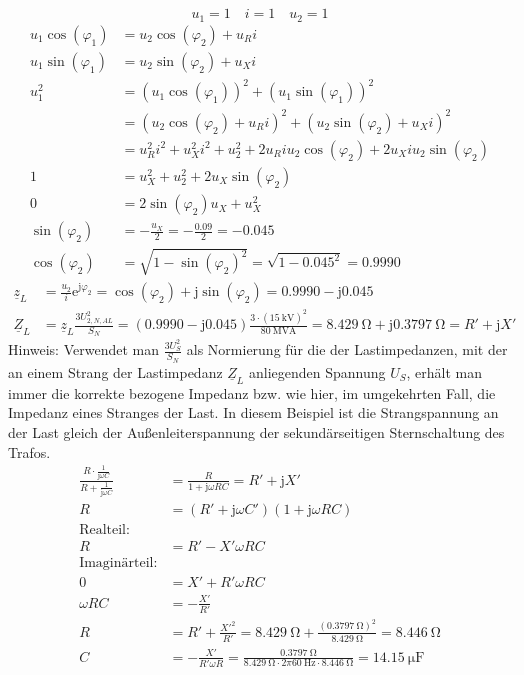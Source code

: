\documentclass[11pt,a4paper]{scrartcl}
\newcommand{\mybr}[1]{\left(#1\right)}
\renewcommand{\j}{\mathrm{j}}
\newcommand{\Z}{\underline{Z}}
\newcommand{\z}{\underline{z}}
\newcommand{\0}{_{\mybr{0}}}
\newcommand{\1}{_{\mybr{1}}}
\newcommand{\2}{_{\mybr{2}}}
\newcommand{\USNA}{U_{2,N,AL}}
\newcommand{\ce}{\cos\mybr{\varphi_1}}
\newcommand{\se}{\sin\mybr{\varphi_1}}
\newcommand{\cz}{\cos\mybr{\varphi_2}}
\newcommand{\sz}{\sin\mybr{\varphi_2}}
\renewcommand{\e}{\mathrm{e}}
\begin{document}
\subsection{}
\begin{equation}
u_1=1\quad i=1\quad u_2=1
\end{equation}
\begin{align}
u_1\ce&=u_2\cz+u_R i\\
u_1\se&=u_2\sz+u_X i\\
u_1^2&=\mybr{u_1\ce}^2+\mybr{u_1\se}^2\\
&=\mybr{u_2\cz+u_R i}^2+\mybr{u_2\sz+u_X i}^2\\
&=u_R^2i^2+u_X^2i^2+u_2^2+2u_R i u_2 \cz+2u_X i u_2\sz\\
1&=u_X^2+u_2^2+2u_X\sz\\
0&=2\sz u_X+u_X^2\\
\sz&=-\frac{u_X}{2}=-\frac{\num{0.09}}{2}=\num{-0.045}\\
\cz&=\sqrt{1-\sz^2}=\sqrt{1-\num{0.045}^2}=\num{0.9990}
\end{align}
\begin{align}
\z_L&=\frac{u_2}{i}\e^{\j\varphi_2}=\cz+\j\sz=\num{0.9990}-\j\num{0.045}\\
\Z_L&=\z_L\frac{3\USNA^2}{S_N}=\mybr{\num{0.9990}-\j\num{0.045}}\frac{3\cdot\mybr{\SI{15}{\kilo\volt}}^2}{\SI{80}{\mega\volt\ampere}}=\SI{8.429}{\ohm}+\j\SI{0.3797}{\ohm}=R'+\j X'
\end{align}
Hinweis: Verwendet man $\frac{3U_S^2}{S_N}$ als Normierung für die der Lastimpedanzen, mit der an einem Strang der Lastimpedanz $\Z_L$ anliegenden Spannung $U_S$, erhält man immer die korrekte bezogene Impedanz bzw. wie hier, im umgekehrten Fall, die Impedanz eines Stranges der Last. In diesem Beispiel ist die Strangspannung an der Last gleich der Außenleiterspannung der sekundärseitigen Sternschaltung des Trafos.
\begin{align}
\frac{R\cdot\frac{1}{\j\omega C}}{R+\frac{1}{\j\omega C}}&=\frac{R}{1+\j\omega R C}=R'+\j X'\\
R&=\mybr{R'+\j\omega C'}\mybr{1+\j\omega R C}\\
\text{Realteil:}\\
R&=R'-X'\omega R C\\
\text{Imaginärteil:}\\
0&=X'+R'\omega R C\\
\omega R C &= -\frac{X'}{R'}\\
R &= R' + \frac{X'^2}{R'}=\SI{8.429}{\ohm} + \frac{\mybr{\SI{0.3797}{\ohm}}^2}{\SI{8.429}{\ohm}}=\SI{8.446}{\ohm}\\
C &= -\frac{X'}{R'\omega R}=\frac{\SI{0.3797}{\ohm}}{\SI{8.429}{\ohm}\cdot2\pi\SI{60}{\hertz}\cdot\SI{8.446}{\ohm}}=\SI{14.15}{\micro\farad}
\end{align}
\end{document}
